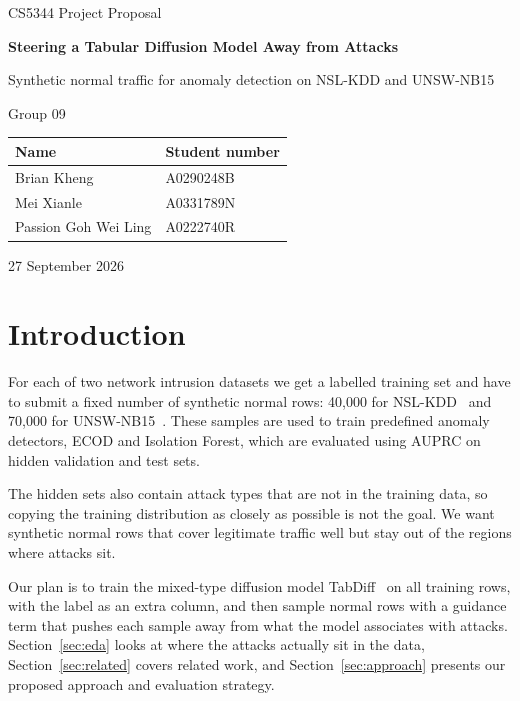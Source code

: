 \documentclass[11pt,a4paper]{article}
\newcommand{\groupnumber}{09}
\begin{document}
\begin{titlepage}
\centering
\vspace*{3cm}
{\large CS5344 Project Proposal\par}
\vspace{1.2cm}
{\LARGE\bfseries Steering a Tabular Diffusion Model Away from Attacks\par}
\vspace{0.5cm}
{\large Synthetic normal traffic for anomaly detection on NSL-KDD and UNSW-NB15\par}
\vspace{2cm}
{\Large Group \groupnumber\par}
\vspace{0.8cm}
\begin{tabular}{ll}
\toprule
Name & Student number \\
\midrule
Brian Kheng & A0290248B \\
Mei Xianle & A0331789N \\
Passion Goh Wei Ling & A0222740R \\
\bottomrule
\end{tabular}
\vfill
{\large 27 September 2026\par}
\end{titlepage}

\section{Introduction}

For each of two network intrusion datasets we get a labelled training set and have to submit a fixed number of synthetic normal rows: 40,000 for NSL-KDD~\cite{tavallaee2009nslkdd} and 70,000 for UNSW-NB15~\cite{moustafa2015unsw}. These samples are used to train predefined anomaly detectors, ECOD and Isolation Forest, which are evaluated using AUPRC on hidden validation and test sets.

The hidden sets also contain attack types that are not in the training data, so copying the training distribution as closely as possible is not the goal. We want synthetic normal rows that cover legitimate traffic well but stay out of the regions where attacks sit.

Our plan is to train the mixed-type diffusion model TabDiff~\cite{shi2025tabdiff} on all training rows, with the label as an extra column, and then sample normal rows with a guidance term that pushes each sample away from what the model associates with attacks. Section~\ref{sec:eda} looks at where the attacks actually sit in the data, Section~\ref{sec:related} covers related work, and Section~\ref{sec:approach} presents our proposed approach and evaluation strategy.
\end{document}
